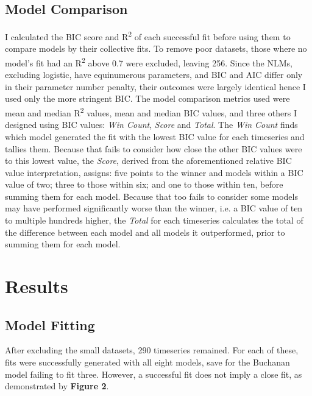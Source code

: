 \documentclass[11pt]{article}
\begin{document}
\subsection{Model Comparison}
I calculated the BIC score and R\textsuperscript{2} of each successful fit before using them to compare models by their collective fits. To remove poor datasets, those where no model's fit had an R\textsuperscript{2} above 0.7 were excluded, leaving 256. Since the NLMs, excluding logistic, have equinumerous parameters, and BIC and AIC differ only in their parameter number penalty, their outcomes were largely identical hence I used only the more stringent BIC.
The model comparison metrics used were mean and median R\textsuperscript{2} values, mean and median BIC values, and three others I designed using BIC values: \textit{Win Count}, \textit{Score} and \textit{Total}. The \textit{Win Count} finds which model generated the fit with the lowest BIC value for each timeseries and tallies them.
Because that fails to consider how close the other BIC values were to this lowest value, the \textit{Score}, derived from the aforementioned relative BIC value interpretation, assigns: five points to the winner and models within a BIC value of two; three to those within six; and one to those within ten, before summing them for each model.
Because that too fails to consider some models may have performed significantly worse than the winner, i.e. a BIC value of ten to multiple hundreds higher, the \textit{Total} for each timeseries calculates the total of the difference between each model and all models it outperformed, prior to summing them for each model.



\section{Results}%


\subsection{Model Fitting}

After excluding the small datasets, 290 timeseries remained. For each of these, fits were successfully generated with all eight models, save for the Buchanan model failing to fit three. However, a successful fit does not imply a close fit, as demonstrated by \textbf{Figure 2}. 
\end{document}

